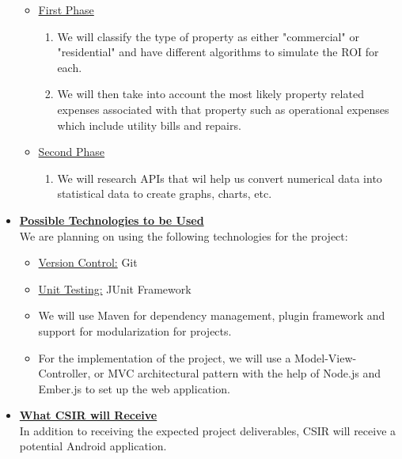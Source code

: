 \documentclass[a4paper,12pt]{article}
\begin{document}
\begin{itemize}
\begin{itemize}
	\item \underline{First Phase}

		\begin{enumerate}
		\item We will classify the type of property as either "commercial" or "residential" and have different algorithms to 				simulate the ROI for each. 
		\item We will then take into account the most likely property related expenses associated with that property such 			as operational expenses which include utility bills and repairs.
		\end{enumerate}
	
	\item \underline{Second Phase}

		\begin{enumerate}
		\item We will research APIs that wil help us convert numerical data into statistical data to create graphs, charts, 				etc.
		\end{enumerate}

	\end{itemize}

\newpage
\item {\large \underline{\textbf{Possible Technologies to be Used}}}\\[0.2cm]
We are planning on using the following technologies for the project:
	\begin{itemize}
		\item \underline {Version Control:} Git
		\\
		\item  \underline{Unit Testing:} JUnit Framework
		\\
		\item We will use Maven for dependency management, plugin framework and support for modularization for 				projects.
		\\
		\item For the implementation of the project, we will use a Model-View-Controller, or MVC architectural pattern with 			the help of Node.js and Ember.js to set up the web application.
	\end{itemize}

\bigskip
 \item {\large \underline{\textbf{What CSIR will Receive}}}\\[0.2cm]
In addition to receiving the expected project deliverables, CSIR will receive a potential Android application. 
\end{itemize}
\end{document}
